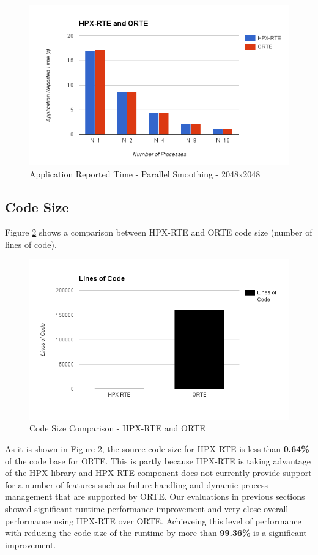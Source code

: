 \begin{figure}[h!]
  \centering
  \includegraphics[scale=0.7]{images/time-app-smoother-2048-infiniband.png}
  \caption[Application Reported Time - Parallel Smoothing - 2048x2048]{Application Reported Time - Parallel Smoothing - 2048x2048}
  \label{fig:time-app-smoother-2048-infiniband}
\end{figure}


\clearpage
\subsection{Code Size}
Figure \ref{fig:code-size} shows a comparison between HPX-RTE and ORTE code size (number of lines of code).

\begin{figure}[h!]
  \centering
  \includegraphics[scale=0.7]{images/code-size.png}
  \caption[Code Size Comparison - HPX-RTE and ORTE]{Code Size Comparison - HPX-RTE and ORTE}
  \label{fig:code-size}
\end{figure}

As it is shown in Figure \ref{fig:code-size}, the source code size for HPX-RTE is less than \textbf{0.64\%} of the code base for ORTE. This is partly because HPX-RTE is taking advantage of the HPX library and HPX-RTE component does not currently provide support for a number of features such as failure handling and dynamic process management that are supported by ORTE. Our evaluations in previous sections showed significant runtime performance improvement and very close overall performance using HPX-RTE over ORTE. Achieveing this level of performance with reducing the code size of the runtime by more than \textbf{99.36\%} is a significant improvement.

